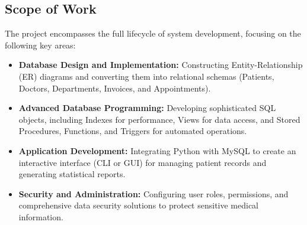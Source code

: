 \subsection{Scope of Work}
The project encompasses the full lifecycle of system development, focusing on the following key areas:
\begin{itemize}
    \item \textbf{Database Design and Implementation:} Constructing Entity-Relationship (ER) diagrams and converting them into relational schemas (Patients, Doctors, Departments, Invoices, and Appointments).
    \item \textbf{Advanced Database Programming:} Developing sophisticated SQL objects, including Indexes for performance, Views for data access, and Stored Procedures, Functions, and Triggers for automated operations.
    \item \textbf{Application Development:} Integrating Python with MySQL to create an interactive interface (CLI or GUI) for managing patient records and generating statistical reports.
    \item \textbf{Security and Administration:} Configuring user roles, permissions, and comprehensive data security solutions to protect sensitive medical information.
\end{itemize}
